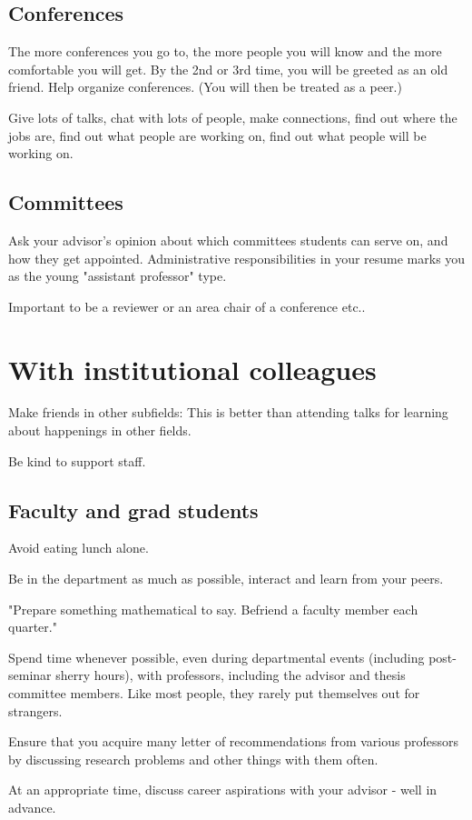 \documentclass[oneside, article]{memoir}
\begin{document}
\subsection{Conferences}
The more conferences you go to, the more people you will know and the more comfortable you will get. By the 2nd or 3rd time, you will be greeted as an old friend. Help organize conferences. (You will then be treated as a peer.)

Give lots of talks, chat with lots of people, make connections, find out where the jobs are, find out what people are working on, find out what people will be working on.

\subsection{Committees}
Ask your advisor's opinion about which committees students can serve on, and how they get appointed. Administrative responsibilities in your resume marks you as the young "assistant professor" type.

Important to be a reviewer or an area chair of a conference etc..

\section{With institutional colleagues}
Make friends in other subfields: This is better than attending talks for learning about happenings in other fields.

Be kind to support staff.

\subsection{Faculty and grad students}
Avoid eating lunch alone.

Be in the department as much as possible, interact and learn from your peers.

"Prepare something mathematical to say. Befriend a faculty member each quarter."

Spend time whenever possible, even during departmental events (including post-seminar sherry hours), with professors, including the advisor and thesis committee members. Like most people, they rarely put themselves out for strangers.

Ensure that you acquire many letter of recommendations from various professors by discussing research problems and other things with them often.

At an appropriate time, discuss career aspirations with your advisor - well in advance.
\end{document}
